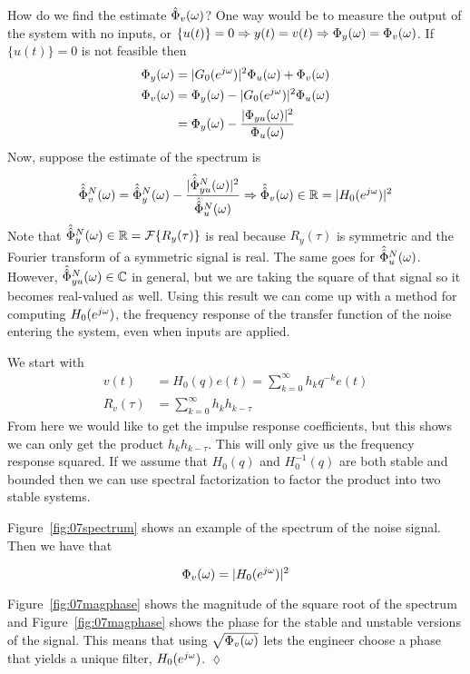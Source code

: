 How do we find the estimate $\hat{\Phi}_v(\omega)$?
One way would be to measure the output of the system with no inputs, or $\{u(t)\}=0 \Rightarrow y(t) = v(t) \Rightarrow \Phi_y(\omega) = \Phi_v(\omega)$.
If $\{u(t)\}=0$ is not feasible then
\begin{align*}
\Phi_y(\omega) &= |G_0(e^{j\omega})|^2\Phi_u(\omega) + \Phi_v(\omega) \\
\Phi_v(\omega) &= \Phi_y(\omega) - |G_0(e^{j\omega})|^2\Phi_u(\omega) \\
&= \Phi_y(\omega) - \frac{|\Phi_{yu}(\omega)|^2}{\Phi_u(\omega)}
\end{align*}
Now, suppose the estimate of the spectrum is
\begin{align*}
\hat{\hat{\Phi}}_v^N(\omega) = \hat{\hat{\Phi}}_y^N (\omega) - \frac{|\hat{\hat{\Phi}}_{yu}^N (\omega)|^2}{\hat{\hat{\Phi}}_u^N (\omega)} \Rightarrow \hat{\hat{\Phi}}_v(\omega)\in\mathbb{R} = |H_0(e^{j\omega})|^2
\end{align*}
Note that $\hat{\hat{\Phi}}_y^N (\omega)\in\mathbb{R} = \mathcal{F}\{R_y(\tau)\}$ is real because $R_y(\tau)$ is symmetric and the Fourier transform of a symmetric signal is real.
The same goes for $\hat{\hat{\Phi}}_u^N (\omega)$.
However, $\hat{\hat{\Phi}}_{yu}^N (\omega)\in\mathbb{C}$ in general, but we are taking the square of that signal so it becomes real-valued as well.
Using this result we can come up with a method for computing $H_0(e^{j\omega})$, the frequency response of the transfer function of the noise entering the system, even when inputs are applied.

We start with
\begin{align*}
v(t) &= H_0(q)e(t) = \sum_{k=0}^\infty h_k q^{-k}e(t) \\
R_v(\tau) &= \sum_{k=0}^\infty h_k h_{k-\tau}
\end{align*}
From here we would like to get the impulse response coefficients, but this shows we can only get the product $h_k h_{k-\tau}$.
This will only give us the frequency response squared.
If we assume that $H_0(q)$ and $H_0^{-1}(q)$ are both stable and bounded then we can use spectral factorization to factor the product into two stable systems.

\begin{example}
Figure~\ref{fig:07spectrum} shows an example of the spectrum of the noise signal.
Then we have that

\begin{equation*}
\Phi_v(\omega) = |H_0(e^{j\omega})|^2
\end{equation*}

Figure~\ref{fig:07magphase} shows the magnitude of the square root of the spectrum and Figure~\ref{fig:07magphase} shows the phase for the stable and unstable versions of the signal.
This means that using $\sqrt{\Phi_v(\omega)}$ lets the engineer choose a phase that yields a unique filter, $H_0(e^{j\omega})$.
$\lozenge$
\end{example}

